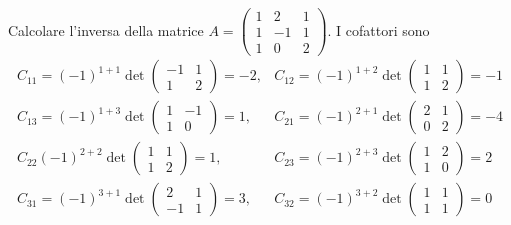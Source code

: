 \begin{es}
  \label{es:Compinveeproddimatrici2}
  Calcolare l'inversa della matrice $A=
  \begin{pmatrix}
    1 & 2 & 1\\
    1 & -1 & 1 \\
    1 & 0 & 2
  \end{pmatrix}
  $.
  I cofattori sono
  \begin{eqnarray*}
    C_{11}=(-1)^{1+1}\det
    \begin{pmatrix}
      -1 & 1 \\
      1 & 2
    \end{pmatrix}=-2,&C_{12}=(-1)^{1+2}\det
                       \begin{pmatrix}
                         1 & 1\\
                         1 & 2
                       \end{pmatrix}=-1\\
    C_{13}=(-1)^{1+3}\det
    \begin{pmatrix}
      1 & -1\\
      1 & 0
    \end{pmatrix}=1, & C_{21}=(-1)^{2+1}\det
                       \begin{pmatrix}
                         2 & 1\\
                         0 & 2
                       \end{pmatrix}=-4\\
    C_{22}(-1)^{2+2}\det
    \begin{pmatrix}
      1 & 1\\
      1 & 2
    \end{pmatrix}=1, &C_{23}=(-1)^{2+3}\det
                       \begin{pmatrix}
                         1&2\\
                         1 & 0
                       \end{pmatrix}=2\\
    C_{31}=(-1)^{3+1}\det
    \begin{pmatrix}
      2 & 1\\
      -1 & 1
    \end{pmatrix}=3, & C_{32}=(-1)^{3+2}\det
                       \begin{pmatrix}
                         1 & 1\\
                         1 & 1
                       \end{pmatrix}=0\\

\end{eqnarray*}
\end{es}
